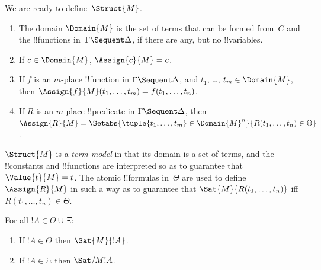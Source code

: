 \documentclass[../../../include/open-logic-section]{subfiles}
\begin{document}
We are ready to define~$\Struct{M}$.
\begin{enumerate}
\item The domain $\Domain{M}$ is the
set of terms that can be formed from~$C$ and the !!{function}s
in~$\Gamma \Sequent \Delta$, if there are any, but no !!{variable}s. 
\item If $c \in \Domain{M}$, $\Assign{c}{M} = c$.
\item If $f$ is an $m$-place !!{function} in $\Gamma \Sequent \Delta$, and $t_1$,
\dots, $t_m \in \Domain{M}$, then $\Assign{f}{M}(t_1, \dots, t_m) =
f(t_1, \dots, t_n)$.
\item If $R$ is an $m$-place !!{predicate} in $\Gamma \Sequent
\Delta$, then $\Assign{R}{M} = \Setabs{\tuple{t_1, \dots, t_m} \in
\Domain{M}^n}{R(t_1, \dots, t_n) \in \Theta}$.
\end{enumerate}
$\Struct{M}$ is a \emph{term model} in that its domain is a set of
terms, and the !!{constant}s and !!{function}s are interpreted so as
to guarantee that $\Value{t}{M} = t$. The atomic !!{formula}s
in~$\Theta$ are used to define $\Assign{R}{M}$ in such a way as to
guarantee that $\Sat{M}{R(t_1, \dots, t_n)}$ iff $R(t_1, \dots, t_n)
\in \Theta$. 

\begin{lem}
For all $!A \in \Theta \cup \Xi$:
\begin{enumerate}
  \item If $!A \in \Theta$ then $\Sat{M}{!A}$.
  \item If $!A \in \Xi$ then $\Sat/{M}{!A}$.
\end{enumerate}
\end{lem}
\end{document}
